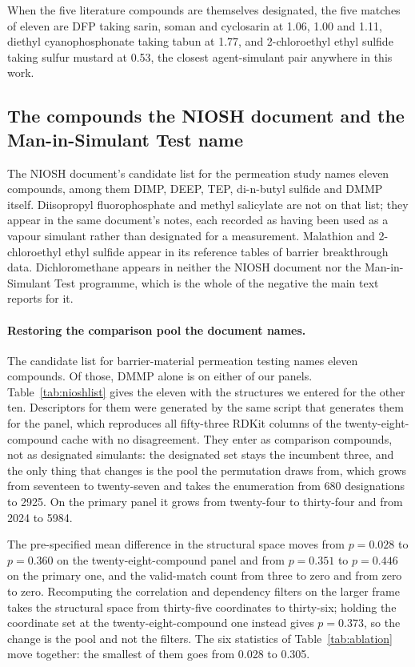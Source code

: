 \documentclass[11pt,a4paper]{article}
\begin{document}
When the five literature compounds are themselves designated, the five matches
of eleven are DFP taking sarin, soman and cyclosarin at 1.06, 1.00 and 1.11,
diethyl cyanophosphonate taking tabun at 1.77, and 2-chloroethyl ethyl sulfide
taking sulfur mustard at 0.53, the closest agent-simulant pair anywhere in this
work.

\subsection{The compounds the NIOSH document and the Man-in-Simulant Test name}
\label{meth:niosh}

The NIOSH document's candidate list for the permeation study names eleven
compounds, among them DIMP, DEEP, TEP, di-n-butyl sulfide and DMMP itself.
Diisopropyl fluorophosphate and methyl salicylate are not on that list; they
appear in the same document's notes, each recorded as having been used as a
vapour simulant rather than designated for a measurement. Malathion and
2-chloroethyl ethyl sulfide appear in its reference tables of barrier
breakthrough data. Dichloromethane appears in neither the NIOSH document nor the
Man-in-Simulant Test programme, which is the whole of the negative the main text
reports for it.

\paragraph{Restoring the comparison pool the document names.} The candidate
list for barrier-material permeation testing names eleven compounds. Of those,
DMMP alone is on either of our panels.
Table~\ref{tab:nioshlist} gives the eleven with the structures we entered for
the other ten.
Descriptors for them were generated by the same script that generates them for
the panel, which reproduces all fifty-three RDKit columns of the
twenty-eight-compound cache with no disagreement. They enter as comparison
compounds, not as designated simulants: the designated set stays the incumbent
three, and the only thing that changes is the pool the permutation draws from,
which grows from seventeen to twenty-seven and takes the enumeration from 680
designations to 2925. On the primary panel it grows from twenty-four to
thirty-four and from 2024 to 5984.

The pre-specified mean difference in the structural space moves from
$p = 0.028$ to $p = 0.360$ on the twenty-eight-compound panel and from
$p = 0.351$ to $p = 0.446$ on the primary one, and the valid-match count from
three to zero and from zero to zero. Recomputing the correlation and dependency
filters on the larger frame takes the structural space from thirty-five
coordinates to thirty-six; holding the coordinate set at the
twenty-eight-compound one instead gives $p = 0.373$, so the change is the pool
and not the filters. The six statistics of Table~\ref{tab:ablation} move
together: the smallest of them goes from 0.028 to 0.305.
\end{document}
